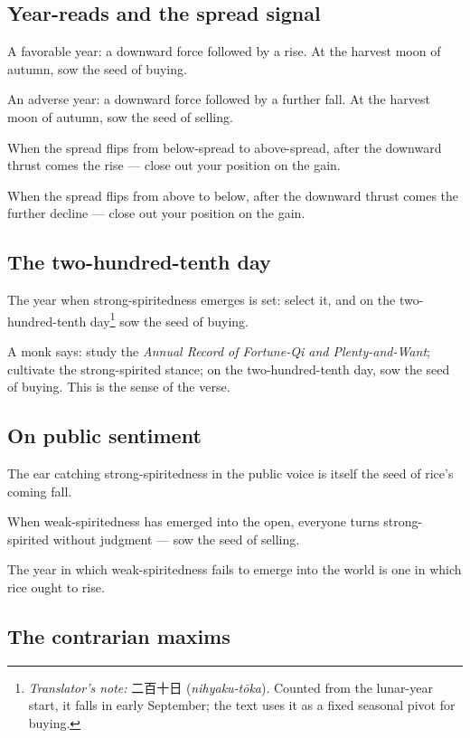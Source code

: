 \documentclass[10pt, openany]{book}
\newcommand{\jp}[1]{{\japanesefont #1}}
\newcommand{\tn}[1]{\footnote{\textit{Translator's note:} #1}}
\begin{document}
\subsection*{Year-reads and the spread signal}

A favorable year: a downward force followed by a rise. At the
harvest moon of autumn, sow the seed of buying.

An adverse year: a downward force followed by a further fall. At
the harvest moon of autumn, sow the seed of selling.

When the spread flips from below-spread to above-spread, after
the downward thrust comes the rise --- close out your position on
the gain.

When the spread flips from above to below, after the downward
thrust comes the further decline --- close out your position on
the gain.

\subsection*{The two-hundred-tenth day}

The year when strong-spiritedness emerges is set: select it, and
on the two-hundred-tenth day\tn{\jp{二百十日}
(\textit{nihyaku-t\=oka}). Counted from the lunar-year start, it
falls in early September; the text uses it as a fixed seasonal
pivot for buying.} sow the seed of buying.

A monk says: study the \textit{Annual Record of Fortune-Qi and
Plenty-and-Want}; cultivate the strong-spirited stance; on the
two-hundred-tenth day, sow the seed of buying. This is the sense
of the verse.

\subsection*{On public sentiment}

The ear catching strong-spiritedness in the public voice is itself
the seed of rice's coming fall.

When weak-spiritedness has emerged into the open, everyone turns
strong-spirited without judgment --- sow the seed of selling.

The year in which weak-spiritedness fails to emerge into the world
is one in which rice ought to rise.

\subsection*{The contrarian maxims}
\end{document}
